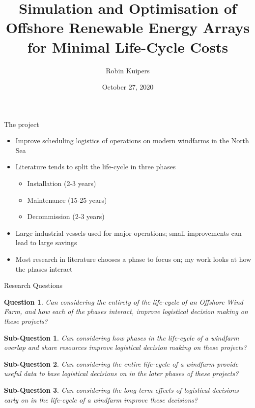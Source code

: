 \documentclass{beamer}
\title[Logistical Optimisation for Offshore Windfarms]{Simulation and Optimisation of Offshore Renewable Energy Arrays for Minimal Life-Cycle Costs}
\author{Robin Kuipers}
\date{October 27, 2020}
\newtheorem*{rquestion}{Question}
\newtheorem{subquestion}{Sub-Question}
\newcommand{\textapprox}{\raisebox{0.5ex}{\texttildelow}}
\begin{document}
\begin{frame}
  \titlepage
\end{frame}


\begin{frame}{The project}
  \begin{itemize}
  	\item Improve scheduling logistics of operations on modern windfarms in the North Sea
  	\item Literature tends to split the life-cycle in three phases
  	\begin{itemize}
  		\item Installation (\textapprox  2-3 years)
  		\item Maintenance (\textapprox 15-25 years)
  		\item Decommission (\textapprox 2-3 years)
  	\end{itemize}
  	\item Large industrial vessels used for major operations; small improvements can lead to large savings
	\item Most research in literature chooses a phase to focus on; my work looks at how the phases interact
  \end{itemize}
\end{frame}


\begin{frame}{Research Questions}
\small
\begin{rquestion}
Can considering the entirety of the life-cycle of an Offshore Wind Farm, and how each of the phases interact, improve logistical decision making on these projects?
\end{rquestion}

\bigskip

\begin{subquestion}
Can considering how phases in the life-cycle of a windfarm overlap and share resources improve logistical decision making on these projects?
\end{subquestion}

\begin{subquestion}
Can considering the entire life-cycle of a windfarm provide useful data to base logistical decisions on in the later phases of these projects?
\end{subquestion}

\begin{subquestion}
Can considering the long-term effects of logistical decisions early on in the life-cycle of a windfarm improve these decisions? 
\end{subquestion}
\end{frame}
\end{document}
